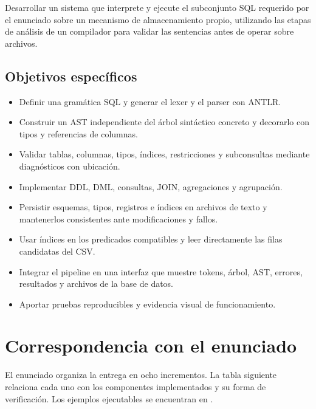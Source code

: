 \documentclass[11pt,a4paper]{article}
\begin{document}
Desarrollar un sistema que interprete y ejecute el subconjunto SQL requerido
por el enunciado sobre un mecanismo de almacenamiento propio, utilizando
las etapas de análisis de un compilador para validar las sentencias antes
de operar sobre archivos.

\subsection{Objetivos específicos}
\begin{itemize}
  \item Definir una gramática SQL y generar el lexer y el parser con ANTLR.
  \item Construir un AST independiente del árbol sintáctico concreto y
        decorarlo con tipos y referencias de columnas.
  \item Validar tablas, columnas, tipos, índices, restricciones y
        subconsultas mediante diagnósticos con ubicación.
  \item Implementar DDL, DML, consultas, JOIN, agregaciones y agrupación.
  \item Persistir esquemas, tipos, registros e índices en archivos de texto
        y mantenerlos consistentes ante modificaciones y fallos.
  \item Usar índices en los predicados compatibles y leer directamente
        las filas candidatas del CSV.
  \item Integrar el pipeline en una interfaz que muestre tokens, árbol,
        AST, errores, resultados y archivos de la base de datos.
  \item Aportar pruebas reproducibles y evidencia visual de funcionamiento.
\end{itemize}

\section{Correspondencia con el enunciado}

El enunciado organiza la entrega en ocho incrementos. La tabla siguiente
relaciona cada uno con los componentes implementados y su forma de
verificación. Los ejemplos ejecutables se encuentran en
.
\end{document}
